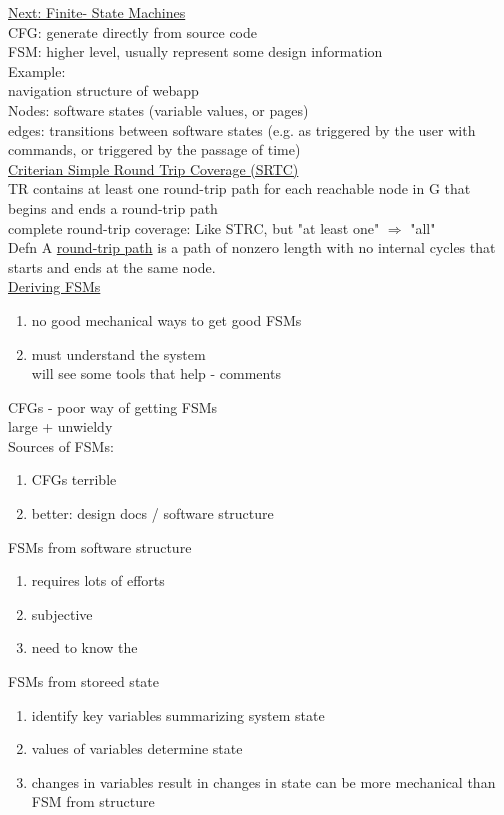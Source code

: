 \documentclass[10pt,usletter]{article}
\newcommand{\tab}[1][1cm]{\hspace*{#1}}
\begin{document}
\underline{Next: Finite- State Machines}\\
CFG: generate directly from source code\\
FSM: higher level, usually represent some design information\\
Example:\\
\tab navigation structure of webapp\\
Nodes: software states (variable values, or pages)\\
edges: transitions between software states (e.g. as triggered by the user with commands, or triggered by the passage of time)\\

\underline{Criterian Simple Round Trip Coverage (SRTC)}\\
TR contains at least one round-trip path for each reachable node in G that begins and ends a round-trip path\\
complete round-trip coverage: Like STRC, but "at least one" $\Rightarrow$ "all"\\
Defn A \underline{round-trip path} is a path of nonzero length with no internal cycles that starts and ends at the same node.\\

\underline{Deriving FSMs}\\
\begin{enumerate}
\item no good mechanical ways to get good FSMs
\item must understand the system\\
\tab will see some tools that help - comments 
\end{enumerate}
CFGs - poor way of getting FSMs\\
large + unwieldy\\

Sources of FSMs:
\begin{enumerate}
\item CFGs terrible
\item better: design docs / software structure	
\end{enumerate}
FSMs from software structure
\begin{enumerate}
\item requires lots of efforts
\item subjective
\item need to know the 
\end{enumerate}
FSMs from storeed state
\begin{enumerate}
\item identify key variables summarizing system state
\item values of variables determine state
\item changes in variables result in changes in state can be more mechanical than FSM from structure
\end{enumerate}
\end{document}

